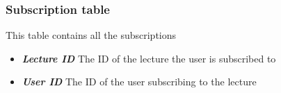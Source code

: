 \subsubsection{Subscription table}
This table contains all the subscriptions

\begin{itemize}
	\item  \textit{\textbf{Lecture ID}} The ID of the lecture the user is subscribed to
	\item  \textit{\textbf{User ID}} The ID of the user subscribing to the lecture
\end{itemize}





















